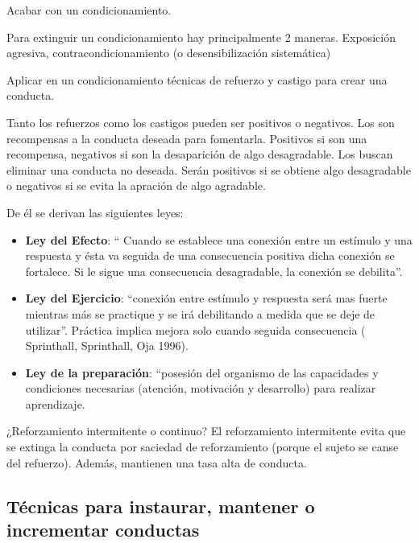 \documentclass[palatino,nochap]{apuntesURJC}
\begin{document}
\begin{defn}[Extinción]
Acabar con un condicionamiento.
\end{defn}

Para extinguir un condicionamiento hay principalmente 2 maneras. Exposición agresiva, contracondicionamiento (o desensibilización sistemática)




\begin{defn}
Aplicar en un condicionamiento técnicas de refuerzo y castigo para crear una conducta.
%

\end{defn}

Tanto los refuerzos como los castigos pueden ser positivos o negativos. 
%
Los  son recompensas a la conducta deseada para fomentarla.
%
Positivos si son una recompensa, negativos si son la desaparición de algo desagradable.
%
Los  buscan eliminar una conducta no deseada.
%
Serán positivos si se obtiene algo desagradable o negativos si se evita la apración de algo agradable.

De él se derivan las siguientes leyes:
\begin{itemize}
\item \textbf{Ley del Efecto}: “ Cuando se establece una conexión entre un estímulo y una
respuesta y ésta va seguida de una consecuencia positiva dicha conexión se fortalece.
Si le sigue una consecuencia desagradable, la conexión se debilita”.
\item \textbf{Ley del Ejercicio}: “conexión entre estímulo y respuesta será mas fuerte mientras
más se practique y se irá debilitando a medida que se deje de utilizar”. Práctica implica
mejora solo cuando seguida consecuencia ( Sprinthall, Sprinthall, Oja 1996).
\item \textbf{Ley de la preparación}: “posesión del organismo de las capacidades y
condiciones necesarias (atención, motivación y desarrollo) para realizar aprendizaje.
\end{itemize}


¿Reforzamiento intermitente o continuo? El reforzamiento intermitente evita que se extinga la conducta por saciedad de reforzamiento (porque el sujeto se canse del refuerzo). Además, mantienen una tasa alta de conducta.


\subsection{Técnicas para instaurar, mantener o incrementar conductas}
\end{document}
